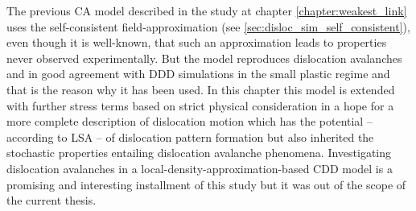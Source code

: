 The previous CA model described in the study at chapter \ref{chapter:weakest_link} uses the self-consistent field-approximation (see \ref{sec:disloc_sim_self_consistent}), even though it is well-known, that such an approximation leads to properties never observed experimentally. But the model reproduces dislocation avalanches and in good agreement with DDD simulations in the small plastic regime and that is the reason why it has been used. In this chapter this model is extended with further stress terms based on strict physical consideration in a hope for a more complete description of dislocation motion which has the potential -- according to LSA -- of dislocation pattern formation but also inherited the stochastic properties entailing dislocation avalanche phenomena. Investigating dislocation avalanches in a local-density-approximation-based CDD model is a promising and interesting installment of this study but it was out of the scope of the current thesis.

